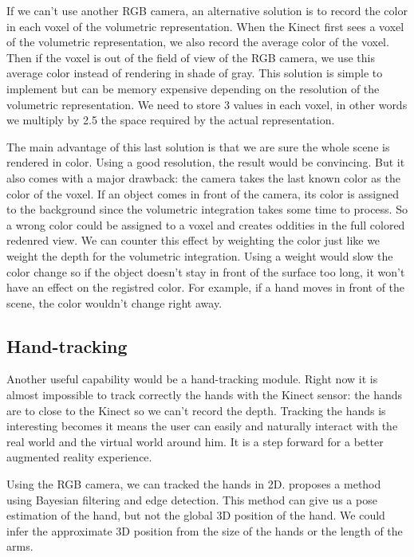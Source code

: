 \documentclass[12pt, twoside]{article}
\begin{document}
If we can't use another RGB camera, an alternative solution is to record the color in each voxel of the volumetric representation. When the Kinect first sees a voxel of the volumetric representation, we also record the average color of the voxel. Then if the voxel is out of the field of view of the RGB camera, we use this average color instead of rendering in shade of gray. This solution is simple to implement but can be memory expensive depending on the resolution of the volumetric representation. We need to store 3 values in each voxel, in other words we multiply by 2.5 the space required by the actual representation.

The main advantage of this last solution is that we are sure the whole scene is rendered in color. Using a good resolution, the result would be convincing. But it also comes with a major drawback: the camera takes the last known color as the color of the voxel. If an object comes in front of the camera, its color is assigned to the background since the volumetric integration takes some time to process. So a wrong color could be assigned to a voxel and creates oddities in the full colored redenred view. We can counter this effect by weighting the color just like we weight the depth for the volumetric integration. Using a weight would slow the color change so if the object doesn't stay in front of the surface too long, it won't have an effect on the registred color. For example, if a hand moves in front of the scene, the color wouldn't change right away.

\subsection{Hand-tracking}
Another useful capability would be a hand-tracking module. Right now it is almost impossible to track correctly the hands with the Kinect sensor: the hands are to close to the Kinect so we can't record the depth. Tracking the hands is interesting becomes it means the user can easily and naturally interact with the real world and the virtual world around him. It is a step forward for a better augmented reality experience.

Using the RGB camera, we can tracked the hands in 2D. \cite{Hand2D} proposes a method using Bayesian filtering and edge detection. This method can give us a pose estimation of the hand, but not the global 3D position of the hand. We could infer the approximate 3D position from the size of the hands or the length of the arms.
\end{document}
